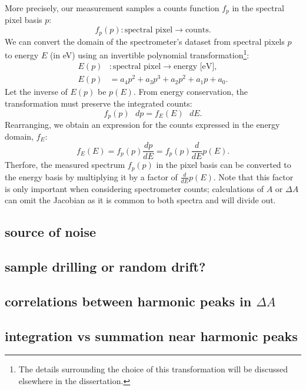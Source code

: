 More precisely, our measurement samples a counts function $f_p$ in the spectral pixel basis $p$:
\begin{equation}
f_p (p): \text{spectral pixel} \rightarrow \text{counts}.
\end{equation}
We can convert the domain of the spectrometer's dataset from spectral pixels $p$ to energy $E$ (in eV) using an invertible polynomial transformation\footnote{The details surrounding the choice of this transformation will be discussed elsewhere in the dissertation.}:
\begin{equation}
\begin{aligned}
E(p)&: \text{spectral pixel} \rightarrow \text{energy [eV]}, \\
E(p) &= a_4 p^2 + a_3 p^3 + a_2 p^2 + a_1 p + a_0.
\end{aligned}
\end{equation}
Let the inverse of $E(p)$ be $p(E)$. From energy conservation, the transformation must preserve the integrated counts:
\begin{equation}
f_p(p) \text{ } dp = f_E(E) \text{ } dE.
\end{equation}
Rearranging, we obtain an expression for the counts expressed in the energy domain, $f_E$:
\begin{equation}
f_E (E) = f_p (p) \frac{dp}{dE} = f_p(p) \frac{d}{dE} p(E).
\label{eqn:spectrometer_jacobian}
\end{equation}
Therfore, the measured spectrum $f_p(p)$ in the pixel basis can be converted to the energy basis by multiplying it by a factor of $\frac{d}{dE} p(E)$. Note that this factor is only important when considering spectrometer counts; calculations of $A$ or $\Delta A$ can omit the Jacobian as it is common to both spectra and will divide out.

\subsection{source of noise}
\subsection{sample drilling or random drift?}
\subsection{correlations between harmonic peaks in $\Delta A$}
\subsection{integration vs summation near harmonic peaks}
